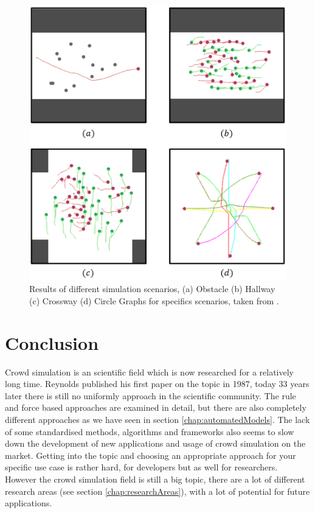 \documentclass{acmsiggraph}               %
\begin{document}
\begin{figure}
  \centering
  \includegraphics[width=1\linewidth]{images/aiSituations.png}
  \caption{Results of different simulation scenarios, (a) Obstacle (b) Hallway (c) Crossway (d) Circle  Graphs for specifics scenarios, taken from \protect\cite{lee_crowd_2018}.}
  \label{fig:aiScenarios}
\end{figure}

\section{Conclusion}
Crowd simulation is an scientific field which is now researched for a relatively long time. Reynolds published his first paper on the topic in 1987, today 33 years later there is still no uniformly approach in the scientific community. The rule and force based approaches are examined in detail, but there are also completely different approaches as we have seen in section \ref{chap:automatedModels}. 
The lack of some standardised methods, algorithms and frameworks also seems to slow down the development of new applications and usage of crowd simulation on the market. Getting into the topic and choosing an appropriate approach for your specific use case is rather hard, for developers but as well for researchers.
However the crowd simulation field is still a big topic, there are a lot of different research areas (see section \ref{chap:researchAreas}), with a lot of potential for future applications.
\end{document}
